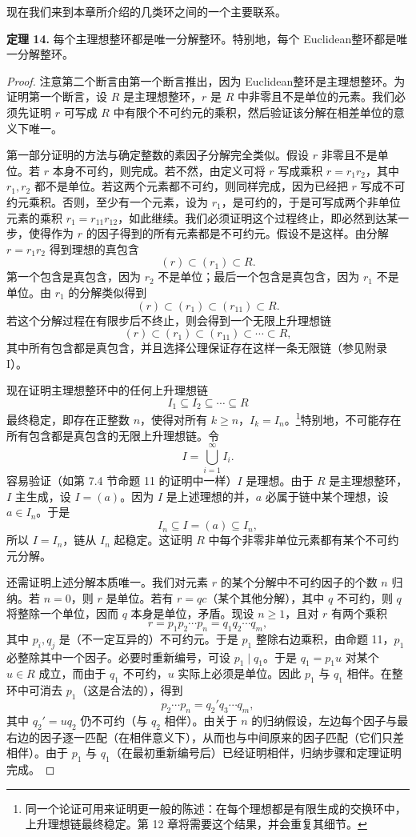 现在我们来到本章所介绍的几类环之间的一个主要联系。

\medskip
\noindent\textbf{定理 14.}
每个主理想整环都是唯一分解整环。特别地，每个 Euclidean整环都是唯一分解整环。

\begin{proof}
	注意第二个断言由第一个断言推出，因为 Euclidean整环是主理想整环。为证明第一个断言，设 $R$ 是主理想整环，$r$ 是 $R$ 中非零且不是单位的元素。我们必须先证明 $r$ 可写成 $R$ 中有限个不可约元的乘积，然后验证该分解在相差单位的意义下唯一。
	
	第一部分证明的方法与确定整数的素因子分解完全类似。假设 $r$ 非零且不是单位。若 $r$ 本身不可约，则完成。若不然，由定义可将 $r$ 写成乘积 $r=r_1r_2$，其中 $r_1,r_2$ 都不是单位。若这两个元素都不可约，则同样完成，因为已经把 $r$ 写成不可约元乘积。否则，至少有一个元素，设为 $r_1$，是可约的，于是可写成两个非单位元素的乘积 $r_1=r_{11}r_{12}$，如此继续。我们必须证明这个过程终止，即必然到达某一步，使得作为 $r$ 的因子得到的所有元素都是不可约元。假设不是这样。由分解 $r=r_1r_2$ 得到理想的真包含
	\[
	(r)\subset (r_1)\subset R.
	\]
	第一个包含是真包含，因为 $r_2$ 不是单位；最后一个包含是真包含，因为 $r_1$ 不是单位。由 $r_1$ 的分解类似得到
	\[
	(r)\subset (r_1)\subset (r_{11})\subset R.
	\]
	若这个分解过程在有限步后不终止，则会得到一个无限上升理想链
	\[
	(r)\subset (r_1)\subset (r_{11})\subset\cdots\subset R,
	\]
	其中所有包含都是真包含，并且选择公理保证存在这样一条无限链（参见附录 I）。
	
	现在证明主理想整环中的任何上升理想链
	\[
	I_1\subseteq I_2\subseteq\cdots\subseteq R
	\]
	最终稳定，即存在正整数 $n$，使得对所有 $k\geq n$，$I_k=I_n$。\footnote{同一个论证可用来证明更一般的陈述：在每个理想都是有限生成的交换环中，上升理想链最终稳定。第 12 章将需要这个结果，并会重复其细节。}特别地，不可能存在所有包含都是真包含的无限上升理想链。令
	\[
	I=\bigcup_{i=1}^{\infty} I_i.
	\]
	容易验证（如第 7.4 节命题 11 的证明中一样）$I$ 是理想。由于 $R$ 是主理想整环，$I$ 主生成，设 $I=(a)$。因为 $I$ 是上述理想的并，$a$ 必属于链中某个理想，设 $a\in I_n$。于是
	\[
	I_n\subseteq I=(a)\subseteq I_n,
	\]
	所以 $I=I_n$，链从 $I_n$ 起稳定。这证明 $R$ 中每个非零非单位元素都有某个不可约元分解。
	
	还需证明上述分解本质唯一。我们对元素 $r$ 的某个分解中不可约因子的个数 $n$ 归纳。若 $n=0$，则 $r$ 是单位。若有 $r=qc$（某个其他分解），其中 $q$ 不可约，则 $q$ 将整除一个单位，因而 $q$ 本身是单位，矛盾。现设 $n\geq1$，且对 $r$ 有两个乘积
	\[
	r=p_1p_2\cdots p_n=q_1q_2\cdots q_m,
	\]
	其中 $p_i,q_j$ 是（不一定互异的）不可约元。于是 $p_1$ 整除右边乘积，由命题 11，$p_1$ 必整除其中一个因子。必要时重新编号，可设 $p_1\mid q_1$。于是 $q_1=p_1u$ 对某个 $u\in R$ 成立，而由于 $q_1$ 不可约，$u$ 实际上必须是单位。因此 $p_1$ 与 $q_1$ 相伴。在整环中可消去 $p_1$（这是合法的），得到
	\[
	p_2\cdots p_n=q_2' q_3\cdots q_m,
	\]
	其中 $q_2'=uq_2$ 仍不可约（与 $q_2$ 相伴）。由关于 $n$ 的归纳假设，左边每个因子与最右边的因子逐一匹配（在相伴意义下），从而也与中间原来的因子匹配（它们只差相伴）。由于 $p_1$ 与 $q_1$（在最初重新编号后）已经证明相伴，归纳步骤和定理证明完成。
\end{proof}

